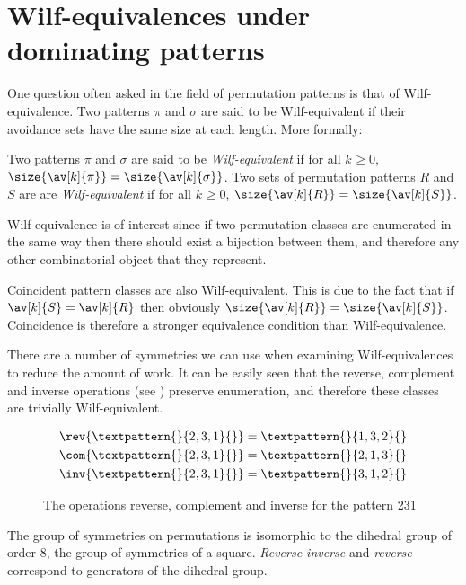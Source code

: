 \chapter[Wilf-Classification]{Wilf-equivalences under dominating  patterns}

One question often asked in the field of permutation patterns is that
of Wilf-equivalence. Two patterns \(\pi\) and \(\sigma\) are said to be
Wilf-equivalent if their avoidance sets have the same size at each
length. More formally:

\begin{definition}
    Two patterns \(\pi\) and \(\sigma\) are said to be \emph{Wilf-equivalent}
    if for all \(k_{} \ge 0\), \(\size{\av[k]{\pi}} = \size{\av[k]{\sigma}}\).
    Two sets of permutation patterns \(R\) and \(S\) are are
    \emph{Wilf-equivalent} if for all \(k_{} \ge 0\),
    \(\size{\av[k]{R}} = \size{\av[k]{S}}\).
\end{definition}

Wilf-equivalence is of interest since if two permutation classes are enumerated
in the same way then there should exist a bijection between them, and therefore
any other combinatorial object that they represent.

Coincident pattern classes are also Wilf-equivalent. This is due to the fact that
if \(\av[k]{S} = \av[k]{R}\) then obviously \(\size{\av[k]{R}} = \size{\av[k]{S}}\).
Coincidence is therefore a stronger equivalence condition than Wilf-equivalence.

There are a number of symmetries we can use when examining Wilf-equivalences
to reduce the amount of work. It can be easily seen that the reverse, complement
and inverse operations (see ) preserve enumeration, and therefore these classes are trivially
Wilf-equivalent.
\begin{figure}[!htb]
\begin{align*}
    \rev{\textpattern{}{2,3,1}{}} &= \textpattern{}{1,3,2}{}\\
    \com{\textpattern{}{2,3,1}{}} &= \textpattern{}{2,1,3}{}\\
    \inv{\textpattern{}{2,3,1}{}} &= \textpattern{}{3,1,2}{}
\end{align*}
\caption{The operations reverse, complement and inverse for the pattern 231}
\label{fig:symm}
\end{figure}

The group of symmetries on permutations is isomorphic to the dihedral group
of order \(8\), the group of symmetries of a square. \emph{Reverse-inverse} and
\emph{reverse} correspond to generators of the dihedral group.


